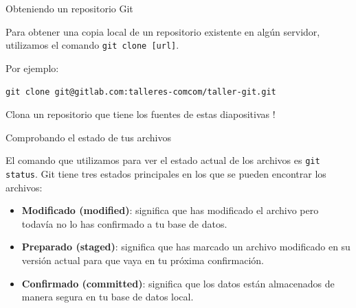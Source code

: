 \documentclass{beamer}
\begin{document}
\begin{frame}{Obteniendo un repositorio Git}


	\begin{block}{}
        Para obtener una copia local de un repositorio existente en algún servidor,
        utilizamos el comando \texttt{git clone [url]}.

        Por ejemplo:

        \vspace{0.5em}

        \texttt{git clone git@gitlab.com:talleres-comcom/taller-git.git}

        \vspace{0.5em}

        Clona un repositorio que tiene los fuentes de estas diapositivas !

    \end{block}

\end{frame}

\begin{frame}{Comprobando el estado de tus archivos}

    El comando que utilizamos para ver el estado actual de los archivos es \texttt{git status}.
    Git tiene tres estados principales en los que se pueden encontrar los archivos:

    \begin{itemize}
        \item \textbf{Modificado (modified)}: significa que has modificado el archivo pero todavía no lo has confirmado a tu base de datos.
        \item \textbf{Preparado (staged)}: significa que has marcado un archivo modificado en su versión actual para que vaya en tu próxima confirmación.
        \item \textbf{Confirmado (committed)}: significa que los datos están almacenados de manera segura en tu base de datos local.
    \end{itemize}


\end{frame}
\end{document}
